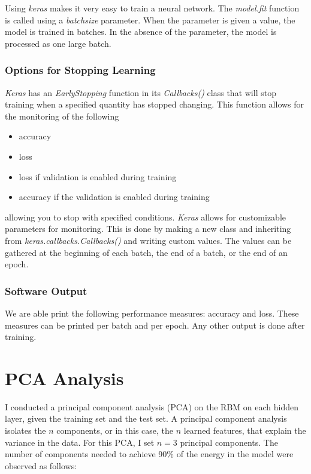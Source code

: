 \documentclass[11pt]{amsart}
\theoremstyle{remark}
\theoremstyle{remark}
\numberwithin{equation}{section}
\newcommand{\n}{\noindent}
\begin{document}
    Using \textit{keras} makes it very easy to train a neural network. The \textit{model.fit}
    function is called using a \textit{batch\textunderscore size} parameter. When the parameter
    is given a value, the model is trained in batches. In the absence of the parameter,
    the model is processed as one large batch.
    
\subsubsection{Options for Stopping Learning}

	\textit{Keras} has an \textit{EarlyStopping} function in its \textit{Callbacks()} 
	class that will stop training when a specified quantity has stopped changing.
	This function allows for the monitoring of the following
	\begin{itemize}
	\item accuracy
	\item loss
	\item loss if validation is enabled during training 
	\item accuracy if the validation is enabled during training
	\end{itemize}
	allowing you to stop with specified conditions. \textit{Keras} allows
	for customizable parameters for monitoring. This is done by making a new class
	and inheriting from \textit{keras.callbacks.Callbacks()} and writing custom 
	values. The values can be gathered at the beginning of each batch, the end of
	a batch, or the end of an epoch. 

  \subsubsection{Software Output}
  We are able print the following performance measures: accuracy and loss. These measures can be printed
  per batch and per epoch. Any other output is done after training.


\section{PCA Analysis}
I conducted a principal component analysis (PCA) on the RBM on each hidden layer, 
given the training set and the test set. A principal component analysis isolates the 
$n$ components, or in this case, the $n$ learned features, that explain the variance
in the data. For this PCA, I set $n=3$ principal components. The number of components
needed to achieve 90\% of the energy in the model were observed as follows: \n
 
\end{document}
